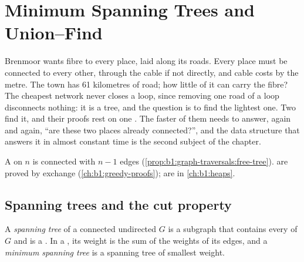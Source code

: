 \chapter{Minimum Spanning Trees and Union--Find}\label{ch:b1:spanning-trees}

Brenmoor wants fibre to every place, laid along its roads. Every place must be connected to every other, through the
cable if not directly, and cable costs by the metre. The town has 61 kilometres of road; how little of it can carry the
fibre? The cheapest network never closes a loop, since removing one road of a loop disconnects nothing: it is a tree,
and the question is to find the lightest one. Two  find it, and their proofs rest on one . The faster of them needs to answer, again and again, ``are these two places already connected?'', and the
data structure that answers it in almost constant time is the second subject of the chapter.

\begin{recall}
A  on $n$  is connected with $n - 1$ edges (\cref{prop:b1:graph-traversals:free-tree}).  are proved by exchange (\cref{ch:b1:greedy-proofs});  are in \cref{ch:b1:heaps}.
\end{recall}

\section{Spanning trees and the cut property}\label{sec:b1:spanning-trees:cut}

\begin{definition}\label{def:b1:spanning-trees:mst}
A \emph{spanning tree} of a connected undirected  $G$ is a subgraph that contains every 
of $G$ and is a . In a , its weight is the sum of the weights of its edges, and a \emph{minimum
spanning tree} is a spanning tree of smallest weight.
\end{definition}


